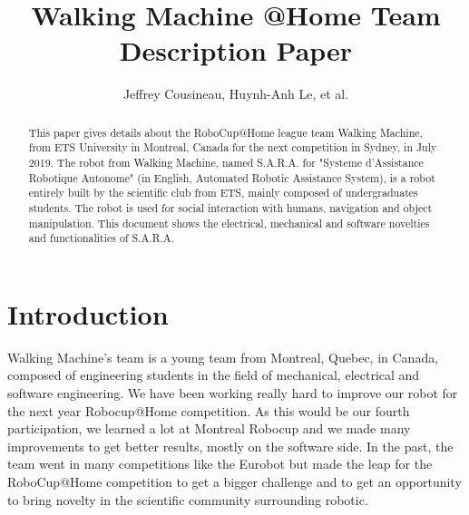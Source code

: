 \documentclass[runningheads,a4paper]{llncs}
\begin{document}
\newif\ifdraft
\draftfalse


\ifdraft
\setlength{\belowcaptionskip}{-5pt}
\fi

\title{Walking Machine @Home \newline {} Team Description Paper}

\author{Jeffrey Cousineau, Huynh-Anh Le, et al.}
\maketitle



\begin{abstract}

This paper gives details about the RoboCup@Home league team Walking Machine, from ETS University in Montreal, Canada for the next competition in Sydney, in July 2019. The robot from Walking Machine, named S.A.R.A. for "Systeme d'Assistance Robotique Autonome" (in English, Automated Robotic Assistance System), is a robot entirely built by the scientific club from ETS, mainly composed of undergraduates students. The robot is used for social interaction with humans, navigation and object manipulation. This document shows the electrical, mechanical and software novelties and functionalities of S.A.R.A.

\end{abstract}


\section{Introduction}
\tab Walking Machine’s team is a young team from Montreal, Quebec, in Canada, composed of engineering students in the field of mechanical, electrical and software engineering. We have been working really hard to improve our robot for the next year Robocup@Home competition. As this would be our fourth participation, we learned a lot at Montreal Robocup and we made many improvements to get better results, mostly on the software side. In the past, the team went in many competitions like the Eurobot but made the leap for the RoboCup@Home competition to get a bigger challenge and to get an opportunity to bring novelty in the scientific community surrounding robotic.\\
\end{document}
